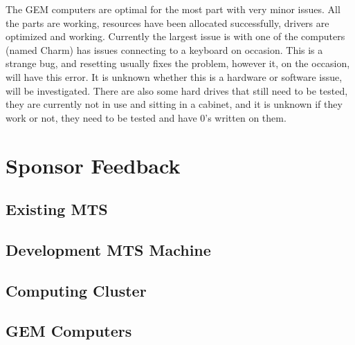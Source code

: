 \documentclass[12pt]{article}
\newcommand\tab[1][1cm]{\hspace*{#1}}
\begin{document}
\tab The GEM computers are optimal for the most part with very minor issues. All the parts are working, resources have been allocated successfully, drivers are optimized and working. Currently the largest issue is with one of the computers (named Charm) has issues connecting to a keyboard on occasion. This is a strange bug, and resetting usually fixes the problem, however it, on the occasion, will have this error. It is unknown whether this is a hardware or software issue, will be investigated. There are also some hard drives that still need to be tested, they are currently not in use and sitting in a cabinet, and it is unknown if they work or not, they need to be tested and have 0's written on them. 

\section{Sponsor Feedback}

\subsection{Existing MTS}

\vspace{1in}

\subsection{Development MTS Machine}

\vspace{1in}

\subsection{Computing Cluster}

\vspace{1in}

\subsection{GEM Computers}

\vspace{1in}
\end{document}
